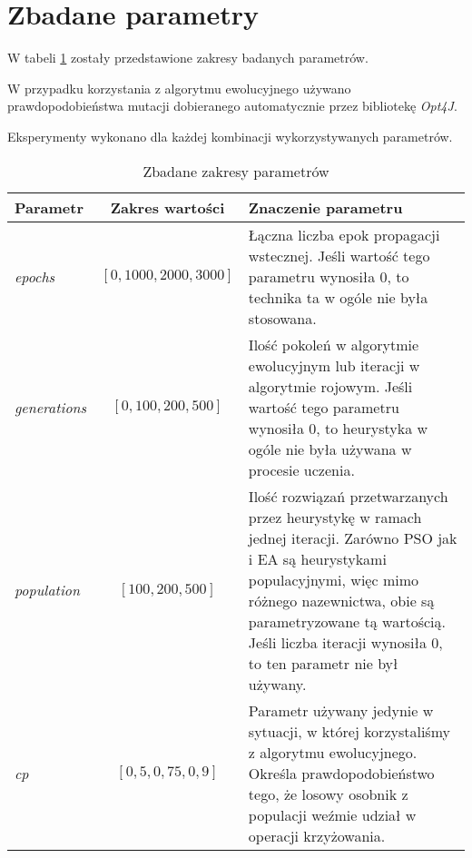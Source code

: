\documentclass[11pt,a4paper,oneside]{report}
\begin{document}
\section{Zbadane parametry}

W tabeli \ref{table:params} zostały przedstawione zakresy badanych parametrów.

W przypadku korzystania z algorytmu ewolucyjnego używano prawdopodobieństwa mutacji dobieranego automatycznie przez bibliotekę \emph{Opt4J}.

Eksperymenty wykonano dla każdej kombinacji wykorzystywanych parametrów.

\begin{table}[H]
	\caption{Zbadane zakresy parametrów \label{table:params}}
	\begin{tabularx}{\linewidth}{|l|c|X|}
		\hline
		\textbf{Parametr} & \textbf{Zakres wartości} & \textbf{Znaczenie parametru}\\
		\hline \hline
		\textit{epochs} & $[0, 1000, 2000, 3000]$ & Łączna liczba epok propagacji wstecznej\footnotemark[1]. Jeśli wartość tego parametru wynosiła 0, to technika ta w ogóle nie była stosowana. \\
		\hline
		\textit{generations} & $[0, 100, 200, 500]$ & Ilość pokoleń w algorytmie ewolucyjnym lub iteracji w algorytmie rojowym. Jeśli wartość tego parametru wynosiła 0, to heurystyka w ogóle nie była używana w procesie uczenia. \\
		\hline
		\textit{population} & $[100, 200, 500]$ &  Ilość rozwiązań przetwarzanych przez heurystykę w ramach jednej iteracji. Zarówno PSO jak i EA są heurystykami populacyjnymi, więc mimo różnego nazewnictwa, obie są parametryzowane tą wartością. Jeśli liczba iteracji wynosiła 0, to ten parametr nie był używany. \\
		\hline
		\textit{cp} & $[0,5, 0,75, 0,9]$	& Parametr używany jedynie w sytuacji, w której korzystaliśmy z algorytmu ewolucyjnego. Określa prawdopodobieństwo tego, że losowy osobnik z populacji weźmie udział w operacji krzyżowania. \\
		\hline
	\end{tabularx}
\end{table}

\end{document}
